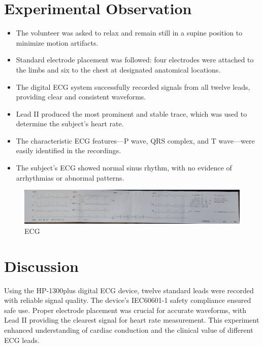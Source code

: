 \documentclass[11pt]{article}
\begin{document}
\section*{Experimental Observation}
\begin{itemize}
    \item The volunteer was asked to relax and remain still in a supine position to minimize motion artifacts.
    \item Standard electrode placement was followed: four electrodes were attached to the limbs and six to the chest at designated anatomical locations.
    \item The digital ECG system successfully recorded signals from all twelve leads, providing clear and consistent waveforms.
    \item Lead II produced the most prominent and stable trace, which was used to determine the subject’s heart rate.
    \item The characteristic ECG features—P wave, QRS complex, and T wave—were easily identified in the recordings.
    \item The subject’s ECG showed normal sinus rhythm, with no evidence of arrhythmias or abnormal patterns.
\end{itemize}

\begin{figure}[H]
    \centering
    \includegraphics[width=1\textwidth]{1.jpg}
    \caption{ECG}
\end{figure}

\section*{Discussion}
Using the HP-1300plus digital ECG device, twelve standard leads were recorded with reliable signal quality. The device’s IEC60601-1 safety compliance ensured safe use. Proper electrode placement was crucial for accurate waveforms, with Lead II providing the clearest signal for heart rate measurement. This experiment enhanced understanding of cardiac conduction and the clinical value of different ECG leads.


\renewcommand{\bibname}{References}

\end{document}
